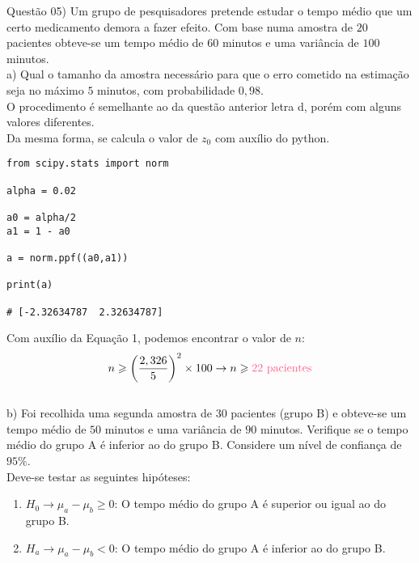 
\noindent \textcolor{COLOR1}{Questão 05)} Um grupo de pesquisadores pretende estudar o tempo médio que um certo medicamento demora a fazer efeito. Com base numa amostra de $20$ pacientes obteve-se um tempo médio de $60$ minutos e uma variância de $100$ minutos.
\\

a) Qual o tamanho da amostra necessário para que o erro cometido na estimação seja no máximo $5$ minutos, com probabilidade $0,98$.
\\

O procedimento é semelhante ao da questão anterior letra d, porém com alguns valores diferentes.\\

Da mesma forma, se calcula o valor de $z_0$ com auxílio do python.\\

\begin{lstlisting}
from scipy.stats import norm
        
alpha = 0.02
                
a0 = alpha/2
a1 = 1 - a0
        
a = norm.ppf((a0,a1))
                
print(a)
        
# [-2.32634787  2.32634787]
\end{lstlisting}

Com auxílio da Equação 1, podemos encontrar o valor de $n$:
\\

\[
    n\geqslant \biggl(\frac{2,326}{5}\biggr)^2 \times 100 \to n\geqslant \textcolor{COLOR2}{22\ \text{pacientes}}
\]
\\

b) Foi recolhida uma segunda amostra de $30$ pacientes (grupo B) e obteve-se um tempo médio de $50$ minutos e uma variância de $90$ minutos. Verifique se o tempo médio do grupo A é inferior ao do grupo B. Considere um nível de confiança de $95\%$.
\\

Deve-se testar as seguintes hipóteses:

\begin{enumerate}
    \item $H_0\to \mu_a - \mu_b\geqslant 0$: O tempo médio do grupo A é superior ou igual ao do grupo B.
    \item $H_a\to \mu_a - \mu_b< 0$: O tempo médio do grupo A é inferior ao do grupo B.
\end{enumerate}

